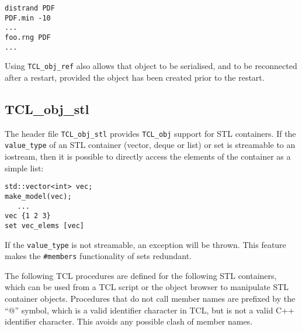 \begin{verbatim}
distrand PDF
PDF.min -10
...
foo.rng PDF
...
\end{verbatim}

Using \verb+TCL_obj_ref+ also allows that object to be serialised, and
to be reconnected after a restart, provided the object has been
created prior to the restart.

\subsection{TCL\_obj\_stl}\label{TCL_obj_stl}

The header file \verb+TCL_obj_stl+ provides \verb+TCL_obj+ support for
STL containers. If the \verb+value_type+ of an STL container (vector, deque
or list) or set is streamable to an iostream, then it is possible to
directly access the elements of the container as a simple list:

\begin{verbatim}
std::vector<int> vec;
make_model(vec);
   ...
vec {1 2 3}
set vec_elems [vec]
\end{verbatim}
If the \verb+value_type+ is not streamable, an exception will be thrown. This
feature makes the \verb+#members+ functionality of sets redundant.

The following TCL procedures are defined for the
following STL containers, which can be used from a TCL script or the
object browser to manipulate STL container objects. Procedures that do
not call member names are prefixed by the ``@'' symbol, which is a
valid identifier character in TCL, but is not a valid C++ identifier
character. This avoids any possible clash of member names.

